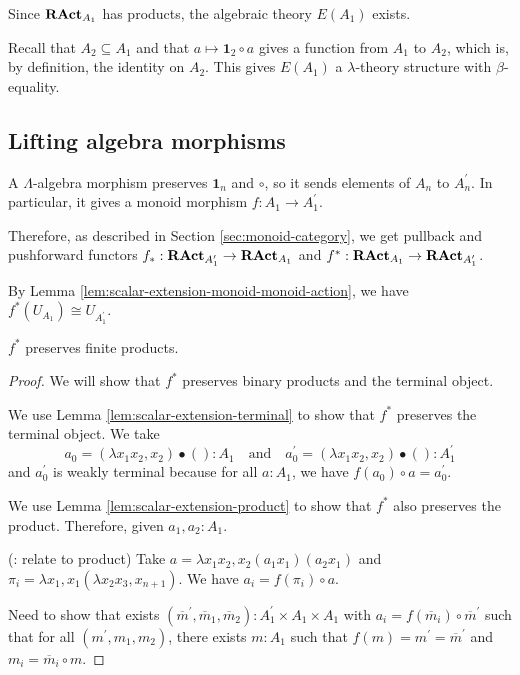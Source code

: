 \begin{definition}
  Since $ \mathbf{RAct}_{A_1} $ has products, the algebraic theory $ E(A_1) $ exists.

  Recall that $ A_2 \subseteq A_1 $ and that $ a \mapsto \mathbf 1_2 \circ a $ gives a function from $ A_1 $ to $ A_2 $, which is, by definition, the identity on $ A_2 $. This gives $ E(A_1) $ a $ \lambda $-theory structure with $ \beta $-equality.
\end{definition}


\subsection{Lifting algebra morphisms}

\begin{definition}
  A $ \Lambda $-algebra morphism preserves $ \mathbf 1_n $ and $ \circ $, so it sends elements of $ A_n $ to $ A^\prime_n $. In particular, it gives a monoid morphism $ f: A_1 \to A^\prime_1 $.

  Therefore, as described in Section \ref{sec:monoid-category}, we get pullback and pushforward functors $ f_*: \mathbf{RAct}_{A^\prime_1} \to \mathbf{RAct}_{A_1} $ and $ f^* : \mathbf{RAct}_{A_1} \to \mathbf{RAct}_{A^\prime_1} $.
\end{definition}

\begin{remark}
  By Lemma \ref{lem:scalar-extension-monoid-monoid-action}, we have $ f^*(U_{A_1}) \cong U_{A^\prime_1} $.
\end{remark}

\begin{lemma}
  $ f^* $ preserves finite products.
\end{lemma}
\begin{proof}
  We will show that $ f^* $ preserves binary products and the terminal object.

  We use Lemma \ref{lem:scalar-extension-terminal} to show that $ f^* $ preserves the terminal object. We take
  \[ a_0 = (\lambda x_1 x_2, x_2) \bullet () : A_1 \quad \text{and} \quad a_0^\prime = (\lambda x_1 x_2, x_2) \bullet () : A^\prime_1 \]
  and $ a_0^\prime $ is weakly terminal because for all $ a : A_1 $, we have $ f(a_0) \circ a = a_0^\prime $.

  We use Lemma \ref{lem:scalar-extension-product} to show that $ f^* $ also preserves the product. Therefore, given $ a_1, a_2 : A_1 $.

  (\TODO: relate to product)
  Take $ a = \lambda x_1 x_2, x_2 (a_1 x_1) (a_2 x_1) $ and $ \pi_i = \lambda x_1, x_1 (\lambda x_2 x_3, x_{n + 1}) $. We have $ a_i = f(\pi_i) \circ a $.

  Need to show that exists $ (\overline m^\prime, \overline m_1, \overline m_2) : A^\prime_1 \times A_1 \times A_1 $ with $ a_i = f(\overline m_i) \circ \overline m^\prime $ such that for all $ (m^\prime, m_1, m_2) $, there exists $ m : A_1 $ such that $ f(m) = m^\prime = \overline m^\prime $ and $ m_i = \overline m_i \circ m $.

  \TODO
\end{proof}

